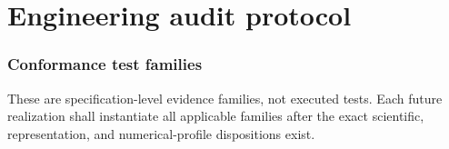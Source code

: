 \documentclass[10pt]{article}
\begin{document}







\part{Engineering audit protocol}

\section{Conformance test families}
\label{sec:ct-families}

These are specification-level evidence families, not executed tests. Each
future realization shall instantiate all applicable families after the exact
scientific, representation, and numerical-profile dispositions exist.
\end{document}
